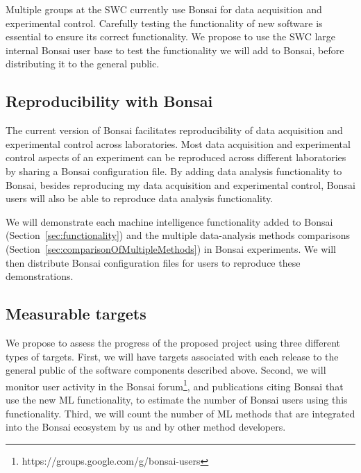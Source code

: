 Multiple groups at the SWC currently use Bonsai for data acquisition and
experimental control. Carefully testing the functionality of new software is
essential to ensure its correct functionality. We propose to use the SWC large
internal Bonsai user base to test the functionality we will add to Bonsai,
before distributing it to the general public.

\subsection{Reproducibility with Bonsai}
\label{sec:reproducibility}

The current version of Bonsai facilitates reproducibility of data acquisition
and experimental control across laboratories. Most data acquisition and
experimental control aspects of an experiment can be reproduced across
different laboratories by sharing a Bonsai configuration file.
%
By adding data analysis functionality to Bonsai, besides reproducing my data
acquisition and experimental control, Bonsai users will also be able to reproduce
data analysis functionality.

We will demonstrate each machine intelligence functionality added to Bonsai
(Section~\ref{sec:functionality}) and the multiple
data-analysis methods comparisons
(Section~\ref{sec:comparisonOfMultipleMethods}) in Bonsai experiments. We will
then distribute Bonsai configuration files for users to reproduce these
demonstrations.

\subsection{Measurable targets}
\label{sec:measurableTargets}

We propose to assess the progress of the proposed project using three different
types of targets.
%
First, we will have targets associated with each release to the general public
of the software components described above. 
%
Second, we will monitor user activity in the Bonsai
forum\footnote{https://groups.google.com/g/bonsai-users},
and publications citing Bonsai that use the new ML functionality,
to estimate the number of Bonsai users using this functionality.
%
Third, we will count the number of ML methods that are integrated
into the Bonsai ecosystem by us and by other method developers.

